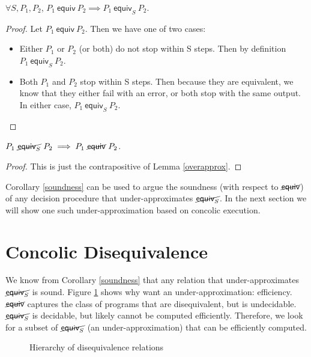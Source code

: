 \documentclass{llncs}
\newcommand{\erel}{\textsf{equiv}}
\newcommand{\merel}[1]{\textsf{equiv}_{#1}}
\newcommand{\pequiv}[2]{#1 \ \erel \ #2}
\newcommand{\pmequiv}[3]{#1 \ \merel{#3} \ #2}
\newcommand{\pnequiv}[2]{#1 \ \cancel{\erel} \ #2}
\newcommand{\pnmequiv}[3]{#1 \ \cancel{\merel{#3}} \ #2}
\begin{document}
\begin{lemma}
\label{overapprox}
$\forall S, P_1, P_2$, $\pequiv{P_1}{P_2} \implies \pmequiv{P_1}{P_2}{S}$.
\end{lemma}

\begin{proof}
Let $\pequiv{P_1}{P_2}$. Then we have one of two cases:
\begin{itemize}
\item Either $P_1$ or $P_2$ (or both) do not stop within S steps. Then by definition $\pmequiv{P_1}{P_2}{S}$.
\item Both $P_1$ and $P_2$ stop within S steps. Then because they are equivalent, we know that they either fail with an error, or both stop with the same output. In either case, $\pmequiv{P_1}{P_2}{S}$.
\end{itemize}
\end{proof}

\begin{corollary}
\label{soundness}
$\pnmequiv{P_1}{P_2}{S} \implies \pnequiv{P_1}{P_2}$. 
\end{corollary}

\begin{proof}
This is just the contrapositive of Lemma \ref{overapprox}.
\end{proof}

Corollary \ref{soundness} can be used to argue the soundness (with respect to $\cancel{\erel}$) of any decision procedure that under-approximates $\cancel{\merel{S}}$. In the next section we will show one such under-approximation based on concolic execution.

\section{Concolic Disequivalence}
\label{ideasection}

We know from Corollary \ref{soundness} that any relation that under-approximates $\cancel{\merel{S}}$ is sound. Figure \ref{hierarchy}  shows why want an under-approximation: efficiency. $\cancel{\erel}$ captures the class of programs that are disequivalent, but is undecidable. $\cancel{\merel{S}}$ is decidable, but likely cannot be computed efficiently. Therefore, we look for a subset of $\cancel{\merel{S}}$ (an under-approximation) that can be efficiently computed.

\begin{figure}
\def\firstcircle{(0,-1.8cm) circle (1.2cm)}
\def\secondcircle{(0,-1cm) circle (2cm)}
\def\thirdcircle{(0,0) circle (3cm)}
\label{hierarchy}
\caption{Hierarchy of disequivalence relations}
\end{figure}
\end{document}
